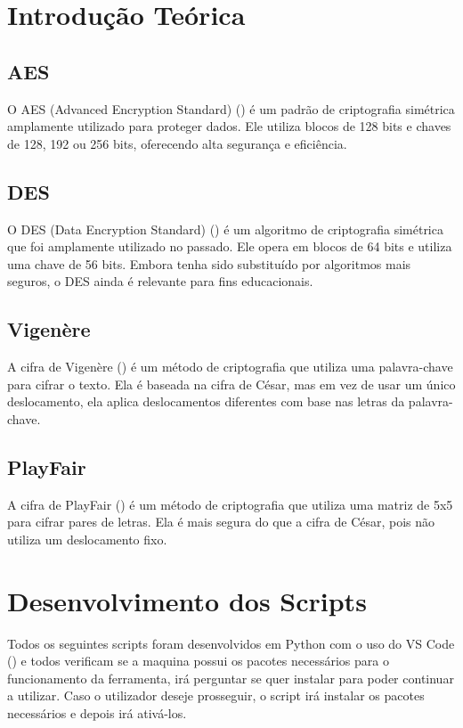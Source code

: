 \documentclass[a4paper]{article}
\begin{document}
\newpage
\section{Introdução Teórica}\label{theory}
\subsection{AES}
O AES (Advanced Encryption Standard) (\cite{aes}) é um padrão de criptografia simétrica amplamente utilizado para proteger dados.
Ele utiliza blocos de 128 bits e chaves de 128, 192 ou 256 bits, oferecendo alta segurança e eficiência.

\subsection{DES}
O DES (Data Encryption Standard) (\cite{des}) é um algoritmo de criptografia simétrica que foi amplamente utilizado no passado.
Ele opera em blocos de 64 bits e utiliza uma chave de 56 bits.
Embora tenha sido substituído por algoritmos mais seguros, o DES ainda é relevante para fins educacionais.

\subsection{Vigenère}
A cifra de Vigenère (\cite{vigenere}) é um método de criptografia que utiliza uma palavra-chave para cifrar o texto.
Ela é baseada na cifra de César, mas em vez de usar um único deslocamento, ela aplica deslocamentos diferentes com
base nas letras da palavra-chave.

\subsection{PlayFair}
A cifra de PlayFair (\cite{playfair}) é um método de criptografia que utiliza uma matriz de 5x5 para cifrar pares de letras.
Ela é mais segura do que a cifra de César, pois não utiliza um deslocamento fixo.

\newpage
\section{Desenvolvimento dos Scripts}\label{dev}
Todos os seguintes scripts foram desenvolvidos em Python com o uso do VS Code (\cite{vscode}) e todos verificam se a maquina possui os pacotes necessários
para o funcionamento da ferramenta, irá perguntar se quer instalar para poder continuar a utilizar. Caso
o utilizador deseje prosseguir, o script irá instalar os pacotes necessários e depois irá ativá-los.
\end{document}
